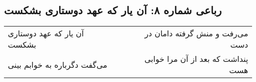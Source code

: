 \begin{center}
\section*{رباعی شماره ۸: آن یار که عهد دوستاری بشکست}
\label{sec:008}
\begin{longtable}{l p{0.5cm} r}
آن یار که عهد دوستاری بشکست
&&
می‌رفت و منش گرفته دامان در دست
\\
می‌گفت دگرباره به خوابم بینی
&&
پنداشت که بعد از آن مرا خوابی هست
\\
\end{longtable}
\end{center}
